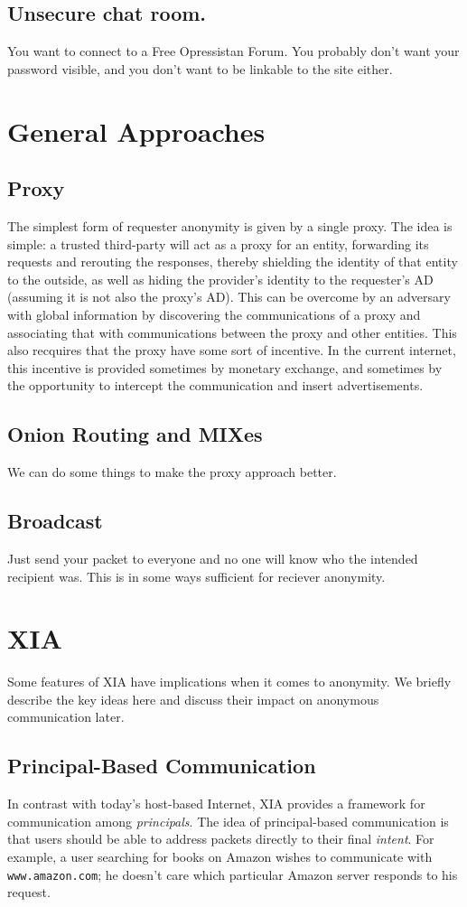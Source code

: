\documentclass{article}
\begin{document}
\subsection{Unsecure chat room.}
You want to connect to a Free Opressistan Forum.  You probably don't want your password visible, and you don't want to be linkable to the site either.


\section{General Approaches}
\subsection{Proxy}
The simplest form of requester anonymity is given by a single proxy.  The idea is simple: a trusted third-party will act as a proxy for an entity, forwarding its requests and rerouting the responses, thereby shielding the identity of that entity to the outside, as well as hiding the provider's identity to the requester's AD (assuming it is not also the proxy's AD).  This can be overcome by an adversary with global information by discovering the communications of a proxy and associating that with communications between the proxy and other entities.  This also recquires that the proxy have some sort of incentive.  In the current internet, this incentive is provided sometimes by monetary exchange, and sometimes by the opportunity to intercept the communication and insert advertisements.
\subsection{Onion Routing and MIXes}
We can do some things to make the proxy approach better.
\subsection{Broadcast}
Just send your packet to everyone and no one will know who the intended recipient was.  This is in some ways sufficient for reciever anonymity.  


\section{XIA}
\label{sec:xia-overview}
Some features of XIA have implications when it comes to anonymity. We briefly describe the key ideas here and discuss their impact on anonymous communication later.
\subsection{Principal-Based Communication}
In contrast with today's host-based Internet, XIA provides a framework for communication among \emph{principals}. The idea of principal-based communication is that users should be able to address packets directly to their final \emph{intent}. For example, a user searching for books on Amazon wishes to communicate with \texttt{www.amazon.com}; he doesn't care which particular Amazon server responds to his request.
\end{document}

